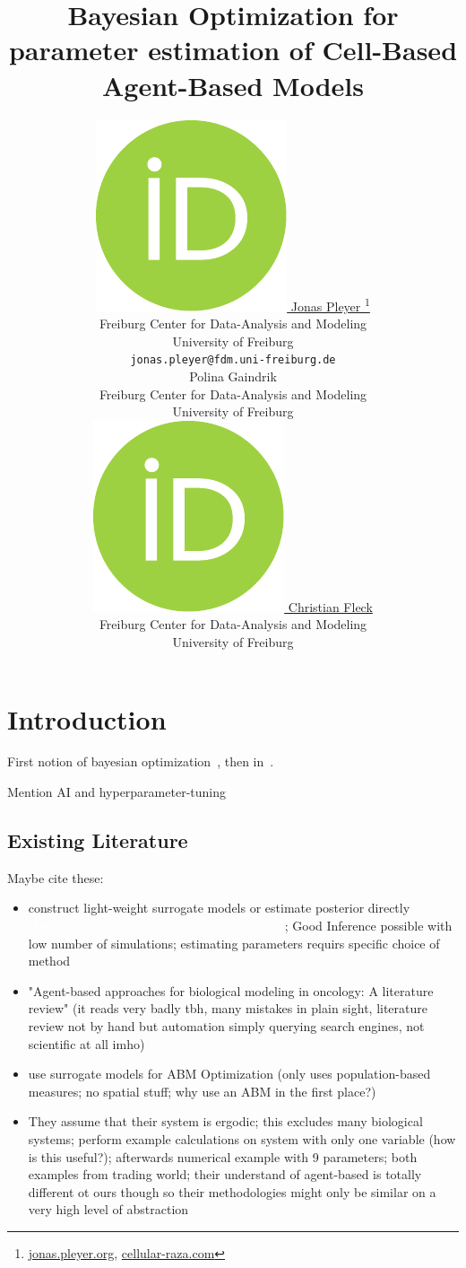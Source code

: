 \documentclass{article}
\title{Bayesian Optimization for parameter estimation of Cell-Based Agent-Based Models}
\author{
    \href{https://orcid.org/0009-0001-0613-7978}{
        \includegraphics[scale=0.06]{orcid.pdf}
        \hspace{1mm}Jonas Pleyer
    }
    \thanks{
        \href{https://jonas.pleyer.org}{jonas.pleyer.org},
        \href{https://cellular-raza.com}{cellular-raza.com}
    }\\
	Freiburg Center for Data-Analysis and Modeling\\
	University of Freiburg\\
	\texttt{jonas.pleyer@fdm.uni-freiburg.de} \\
	\And
    Polina Gaindrik\\
	Freiburg Center for Data-Analysis and Modeling\\
	University of Freiburg\\
	\And
	\href{https://orcid.org/0000-0002-6371-4495}{
        \includegraphics[scale=0.06]{orcid.pdf}
        \hspace{1mm}Christian Fleck
    }\\
	Freiburg Center for Data-Analysis and Modeling\\
	University of Freiburg
}
\newcommand{\todo}[1]{\colorbox{WildStrawberry}{\textcolor{white}{#1}}}
\begin{document}
\maketitle

\begin{abstract}
\end{abstract}



\section{Introduction}
\label{section:introduction}
First notion of bayesian optimization~\cite{Kushner1964}, then in~\cite{Mockus1978}.

Mention AI and hyperparameter-tuning

\subsection*{Existing Literature}

Maybe cite these:
\cite{Lima2021,Duswald2024}

\begin{itemize}
    \item \cite{Jrgensen2022} construct light-weight surrogate models or estimate posterior directly
        \todo{can these surrogate models always be constructed?}; Good Inference possible with low
        number of simulations; estimating parameters requirs specific choice of method
    \item \cite{Stephan2024} "Agent-based approaches for biological modeling in oncology: A
        literature review" (it reads very badly tbh, many mistakes in plain sight, literature review
        not by hand but automation simply querying search engines, not scientific at all imho)
    \item \cite{An2016} use surrogate models for ABM Optimization (only uses population-based
        measures; no spatial stuff; why use an ABM in the first place?)
    \item \cite{Grazzini2017} They assume that their system is ergodic; this excludes many
        biological systems; perform example calculations on system with only one variable (how is
        this useful?); afterwards numerical example with 9 parameters; both examples from trading
        world; their understand of agent-based is totally different ot ours though so their
        methodologies might only be similar on a very high level of abstraction
\end{itemize}
\end{document}
